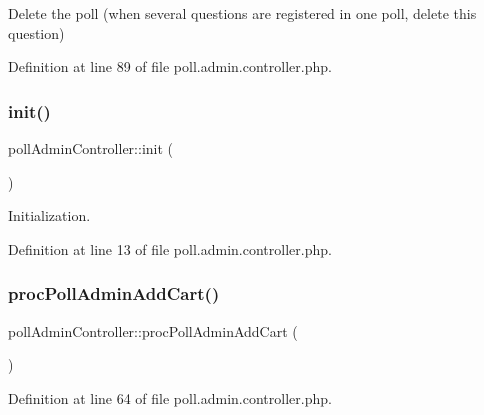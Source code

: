 Delete the poll (when several questions are registered in one poll, delete this question) 



Definition at line 89 of file poll.\+admin.\+controller.\+php.

\hypertarget{classpollAdminController_adaf2c123a1f123bcb92de4f373ead8a9}{}\label{classpollAdminController_adaf2c123a1f123bcb92de4f373ead8a9} 
\subsubsection{\texorpdfstring{init()}{init()}}
{\footnotesize\ttfamily poll\+Admin\+Controller\+::init (\begin{DoxyParamCaption}{ }\end{DoxyParamCaption})}



Initialization. 



Definition at line 13 of file poll.\+admin.\+controller.\+php.

\hypertarget{classpollAdminController_a148e3ec22f5a872647e7208bb853d3a1}{}\label{classpollAdminController_a148e3ec22f5a872647e7208bb853d3a1} 
\subsubsection{\texorpdfstring{proc\+Poll\+Admin\+Add\+Cart()}{procPollAdminAddCart()}}
{\footnotesize\ttfamily poll\+Admin\+Controller\+::proc\+Poll\+Admin\+Add\+Cart (\begin{DoxyParamCaption}{ }\end{DoxyParamCaption})}



Definition at line 64 of file poll.\+admin.\+controller.\+php.

\hypertarget{classpollAdminController_af1a9c9f33253af68ac12e4c026bd699a}{}\label{classpollAdminController_af1a9c9f33253af68ac12e4c026bd699a} 
